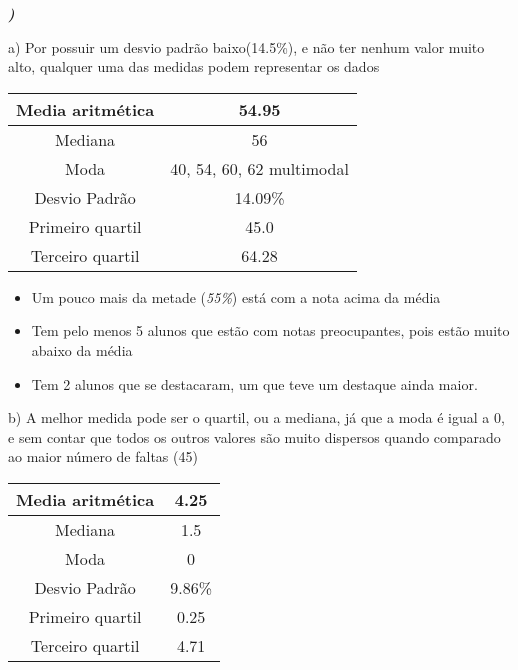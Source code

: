 \documentclass[12pt]{article}
\newcounter{instn}
\newcommand{\instnum}{\arabic{instn}}
\newcommand{\myline}[1]{
    \emph{\textbf{#1)}}
    \addtocounter{instn}{1}
}
\begin{document}
    \myline{\instnum}

    a) Por possuir um desvio padrão baixo(14.5\%), e não ter nenhum valor muito alto,
    qualquer uma das medidas podem representar os dados

    \begin{center}
        \begin{tabular}{|c | c |} 
        \hline
        Media aritmética & 54.95 \\ 
        \hline
        Mediana & 56 \\ 
        \hline
        Moda & 40, 54, 60, 62 multimodal \\ 
        \hline
        Desvio Padrão & 14.09\% \\ 
        \hline
        Primeiro quartil & 45.0 \\ 
        \hline
        Terceiro quartil & 64.28 \\ 
        \hline
       \end{tabular}
    \end{center}

    \begin{itemize}
        \item Um pouco mais da metade (\emph{55\%}) está com a nota acima da média 
        \item Tem pelo menos 5 alunos que estão com notas preocupantes, pois estão muito abaixo da média 
        \item Tem 2 alunos que se destacaram, um que teve um destaque ainda maior.
    \end{itemize}

    \newpage

    b) A melhor medida pode ser o quartil, ou a mediana, já que a moda é igual a 0,
    e sem contar que todos os outros valores são muito dispersos quando comparado ao maior número de faltas (45)

    \begin{center}
        \begin{tabular}{|c | c |} 
        \hline
        Media aritmética & 4.25 \\ 
        \hline
        Mediana & 1.5 \\ 
        \hline
        Moda & 0 \\ 
        \hline
        Desvio Padrão & 9.86\% \\ 
        \hline
        Primeiro quartil & 0.25 \\ 
        \hline
        Terceiro quartil & 4.71 \\ 
        \hline
       \end{tabular}
    \end{center}
\end{document}
